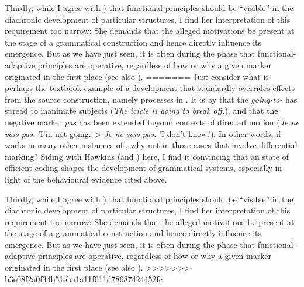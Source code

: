 \documentclass[output=paper]{langsci/langscibook}
\begin{document}
\largerpage
Thirdly, while I agree with ) that functional principles should be “visible” in the diachronic development of particular structures, I find her interpretation of this requirement too narrow: She demands that the alleged motivations be present at the  stage of a grammatical construction and hence directly influence its emergence. But as we have just seen, it is often during the  phase that functional-adaptive principles are operative, regardless of how or why a given marker originated in the first place (see also ). 
=======
Just consider what is perhaps the textbook example of a development that standardly overrides effects from the source construction, namely  processes in . It is by  that the \textit{going-to-} has spread to inanimate subjects (\textit{The icicle is going to break off.}), and that the  negative marker \textit{pas} has been extended beyond contexts of directed motion (\textit{Je ne vais pas.} 'I'm not going.' > \textit{Je ne sais pas.} 'I don't know.'). In other words, if  works in many other instances of , why not in those cases that involve differential marking? Siding with Hawkins (and ) here, I find it convincing that an  state of efficient coding shapes the development of grammatical systems, especially in light of the behavioural evidence cited above.

\largerpage
Thirdly, while I agree with ) that functional principles should be “visible” in the diachronic development of particular structures, I find her interpretation of this requirement too narrow: She demands that the alleged motivations be present at the  stage of a grammatical construction and hence directly influence its emergence. But as we have just seen, it is often during the  phase that functional-adaptive principles are operative, regardless of how or why a given marker originated in the first place (see also ). 
>>>>>>> b3e08f2a0f34b51eba1a11f011d78687424452fc
\end{document}
